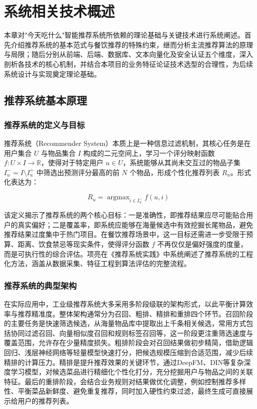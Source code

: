 \chapter{系统相关技术概述}

本章对"今天吃什么"智能推荐系统所依赖的理论基础与关键技术进行系统阐述。首先介绍推荐系统的基本范式与餐饮推荐的特殊约束，继而分析主流推荐算法的原理与局限；随后分别从前端、后端、数据库、文本向量化及安全认证五个维度，深入剖析各技术的核心机制，并结合本项目的业务特征论证技术选型的合理性，为后续系统设计与实现奠定理论基础。

\section{推荐系统基本原理}

\subsection{推荐系统的定义与目标}

推荐系统（Recommender System）本质上是一种信息过滤机制，其核心任务是在用户集合 $U$ 与物品集合 $I$ 构成的二元空间上，学习一个评分映射函数 $f: U \times I \rightarrow \mathbb{R}$，使得对于特定用户 $u \in U$，系统能够从其尚未交互过的物品子集 $I_u^- = I \setminus I_u^+$ 中筛选出预测评分最高的前 $N$ 个物品，形成个性化推荐列表 $R_u$。形式化表达为：

\begin{equation}
R_u = \mathop{\arg\max}_{i \in I_u^-} f(u, i)
\end{equation}

该定义揭示了推荐系统的两个核心目标：一是准确性，即推荐结果应尽可能贴合用户的真实偏好；二是覆盖率，即系统应能够在海量候选中有效挖掘长尾物品，避免推荐结果过度集中于热门项目。在餐饮推荐场景中，这一目标还需进一步受限于预算、距离、饮食禁忌等现实条件，使得评分函数 $f$ 不再仅仅是偏好强度的度量，而是可执行性的综合评估。项亮在《推荐系统实践》中系统阐述了推荐系统的工程化方法，涵盖从数据采集、特征工程到算法评估的完整流程\super{[16]}。

\subsection{推荐系统的典型架构}
在实际应用中，工业级推荐系统大多采用多阶段级联的架构形式，以此平衡计算效率与推荐精准度。整体架构通常分为召回、粗排、精排和重排四个环节。召回阶段的主要任务是快速筛选候选，从海量物品库中提取出上千条相关候选，常用方式包括协同过滤召回、向量相似度召回和规则标签召回等，这一阶段更注重筛选速度与覆盖范围，允许存在少量精度损失。粗排阶段会对召回结果做初步精简，借助逻辑回归、浅层神经网络等轻量模型快速打分，把候选规模压缩到合适范围，减少后续精排的计算压力。精排是提升推荐效果的关键环节，通过DeepFM、DIN等复杂深度学习模型，对候选菜品进行精细化个性化打分，充分挖掘用户与物品之间的关联特征。最后的重排阶段，会结合业务规则对结果做优化调整，例如控制推荐多样性、平衡菜品新鲜度、避免重复推荐，同时加入硬性约束过滤，最终生成可直接展示给用户的推荐列表。

